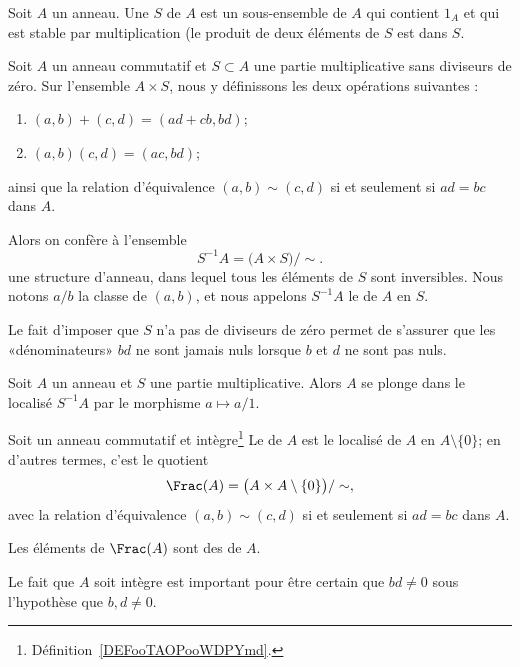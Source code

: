 \begin{definition}
  Soit \( A \) un anneau. Une  \( S \) de \( A \) est un sous-ensemble de \( A \) qui contient \( 1_A \) et qui est stable par multiplication (le produit de deux éléments de \( S \) est dans \( S \).
\end{definition}

\begin{propositionDef}       \label{DEFLocaliseDunAnneau}
    Soit \( A\) un anneau commutatif et \( S \subset A \) une partie multiplicative sans diviseurs de zéro. Sur l'ensemble \( A\times S\), nous y définissons les deux opérations suivantes :
    \begin{enumerate}
        \item
            \( (a,b)+(c,d)=(ad+cb,bd)\);
        \item
            \( (a,b)(c,d)=(ac,bd)\);
    \end{enumerate}
    ainsi que la relation d'équivalence \( (a,b)\sim(c,d)\) si et seulement si \( ad=bc\) dans \( A \).

    Alors on confère à l'ensemble
    \begin{equation}
        S^{-1}A=\big( A\times S \big)/\sim.
    \end{equation}
    une structure d'anneau, dans lequel tous les éléments de \( S \) sont inversibles. Nous notons \( a/b\) la classe de \( (a,b)\), et nous appelons \(S^{-1}A\) le  de \( A \) en \( S \).
\end{propositionDef}

Le fait d'imposer que \( S \) n'a pas de diviseurs de zéro permet de s'assurer que les «dénominateurs» \( bd \) ne sont jamais nuls lorsque \( b \) et \( d \) ne sont pas nuls.

\begin{proposition}
  Soit \( A \) un anneau et \(S \) une partie multiplicative. Alors \( A \) se plonge dans le localisé \( S^{-1}A \) par le morphisme \( a \mapsto a/1 \).
\end{proposition}

\begin{definition}       \label{DEFooGJYXooOiJQvP}
    Soit un anneau commutatif et intègre\footnote{Définition~\ref{DEFooTAOPooWDPYmd}.} Le  de \( A\) est le localisé de \( A \) en \( A \setminus \{ 0 \} \); en d'autres termes, c'est le quotient
    \begin{equation}
        \Frac(A)=\big( A\times A\setminus\{ 0 \} \big)/\sim,
    \end{equation}
    avec la relation d'équivalence  \( (a,b)\sim(c,d)\) si et seulement si \( ad=bc\) dans \( A \).

    Les éléments de \( \Frac(A)\) sont des  de \( A\).
\end{definition}
Le fait que \( A\) soit intègre est important pour être certain que \( bd\neq 0\) sous l'hypothèse que \( b,d\neq 0\).

